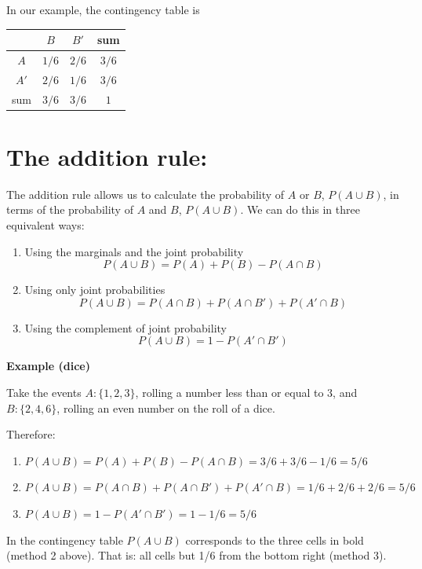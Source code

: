 \documentclass[
]{book}
\begin{document}
In our example, the contingency table is

\begin{longtable}[]{@{}cccc@{}}
\toprule\noalign{}
& \(B\) & \(B'\) & sum \\
\midrule\noalign{}
\endhead
\bottomrule\noalign{}
\endlastfoot
\(A\) & \(1/6\) & \(2/6\) & \(3/6\) \\
\(A'\) & \(2/6\) & \(1/6\) & \(3/6\) \\
sum & \(3/6\) & \(3/6\) & \(1\) \\
\end{longtable}

\hypertarget{the-addition-rule}{%
\section{The addition rule:}\label{the-addition-rule}}

The addition rule allows us to calculate the probability of \(A\) or \(B\), \(P( A \cup B)\), in terms of the probability of \(A\) and \(B\), \(P(A \cup B )\). We can do this in three equivalent ways:

\begin{enumerate}
\def\labelenumi{\arabic{enumi})}
\item
  Using the marginals and the joint probability
  \[P(A \cup B)=P(A) + P(B) - P(A\cap B)\]
\item
  Using only joint probabilities
  \[P( A \cup B)=P(A \cap B)+P(A\cap B')+P(A'\cap B)\]
\item
  Using the complement of joint probability
  \[P(A \cup B)=1-P(A'\cap B')\]
\end{enumerate}

\textbf{Example (dice)}

Take the events \(A:\{ 1,2,3\}\), rolling a number less than or equal to \(3\), and \(B:\{2,4,6\}\), rolling an even number on the roll of a dice.

Therefore:

\begin{enumerate}
\def\labelenumi{\arabic{enumi})}
\item
  \(P( A \cup B)=P(A) + P(B) - P(A\cap B)=3/6+3/6-1/6=5/6\)
\item
  \(P(A \cup B)=P(A \cap B)+P(A\cap B')+P(A'\cap B)=1/6+2/6+2/6=5/6\)
\item
  \(P(A \cup B)=1-P(A'\cap B')= 1-1/6=5/6\)
\end{enumerate}

In the contingency table \(P( A \cup B)\) corresponds to the three cells in bold (method 2 above). That is: all cells but 1/6 from the bottom right (method 3).
\end{document}
